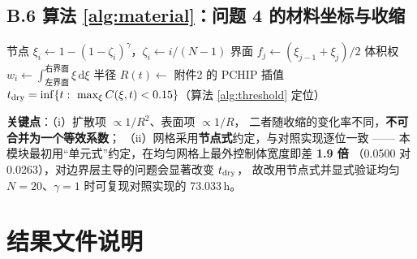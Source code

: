 \subsection*{B.6 算法 \ref{alg:material}：问题 4 的材料坐标与收缩}

\begin{algorithm}[H]
\caption{材料坐标下的收缩求解（\texttt{problem4.py}：\texttt{assemble}\,/\,\texttt{solve\_p4}，第 132--245 行）}
\label{alg:material}
\BlankLine
{}
节点 $\xi_i \gets 1-(1-\zeta_i)^\gamma$，$\zeta_i \gets i/(N-1)$
界面 $f_j \gets (\xi_{j-1}+\xi_j)/2$\;
体积权 $w_i \gets \int_{\text{左界面}}^{\text{右界面}}\xi\,\mathrm d\xi$\;
半径 $R(t) \gets$ 附件2 的 PCHIP 插值\;
\BlankLine
{}
\BlankLine
{}
\Return $\tdry = \inf\{t:\ \max_\xi C(\xi,t)<0.15\}$（算法 \ref{alg:threshold} 定位）\;
\end{algorithm}

\noindent\textbf{关键点}：（i）扩散项 $\propto1/R^2$、表面项 $\propto1/R$，
二者随收缩的变化率不同，\textbf{不可合并为一个等效系数}；
（ii）网格采用\textbf{节点式}约定，与对照实现逐位一致 ——
本模块最初用``单元式''约定，在均匀网格上最外控制体宽度即差 \textbf{1.9 倍}
（0.0500 对 0.0263），对边界层主导的问题会显著改变 $t_{\mathrm{dry}}$，
故改用节点式并显式验证均匀 $N=20$、$\gamma=1$ 时可复现对照实现的 73.033\,h。

\section{结果文件说明}
\setcounter{table}{0}

